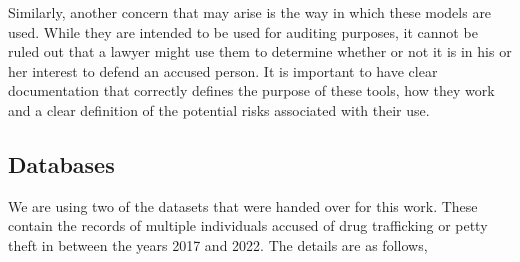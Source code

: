 \documentclass[fleqn,10pt]{wlscirep}
\begin{document}
Similarly, another concern that may arise is the way in which these models are used. While they are intended to be used for auditing purposes, it cannot be ruled out that a lawyer might use them to determine whether or not it is in his or her interest to defend an accused person. It is important to have clear documentation that correctly defines the purpose of these tools, how they work and a clear definition of the potential risks associated with their use.

\subsection{Databases}\label{subsec:Databases}

We are using two of the datasets that were handed over for this work. These contain the records of multiple individuals accused of drug trafficking or petty theft in between the years 2017 and 2022. The details are as follows,
\end{document}
